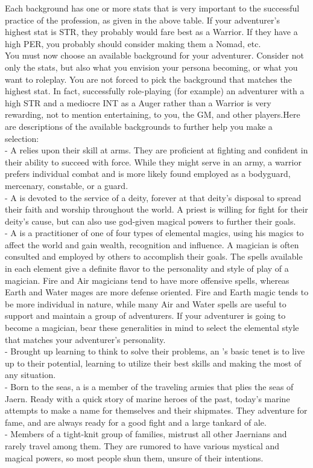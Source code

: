 \begin{multicols*}{2}
Each background has one or more stats that is very important to the successful practice of the profession, as given in the above table. If your adventurer's highest stat is
STR, they probably would fare best as a Warrior. If they have a high PER, you probably should consider making them a Nomad, etc.\\
You must now choose an available background for your adventurer. Consider not only the stats, but also what you envision your persona becoming, or what you want to roleplay. You are not forced to pick the background that matches the highest stat. In fact, successfully role-playing (for example) an adventurer with a high STR and a mediocre INT as a Auger rather than a Warrior is very rewarding, not to mention entertaining, to you, the GM, and other players.Here are descriptions of the available backgrounds to further help you make a selection:\\
- A  relies upon their skill at arms. They are proficient at fighting and confident in their ability to succeed with force. While they might serve in an army, a warrior prefers individual combat and is more likely found employed as a bodyguard, mercenary, constable, or a guard.\\
- A  is devoted to the service of a deity, forever at that deity's disposal to spread their faith and worship throughout the world. A priest is willing for fight for their deity's cause, but can also use god-given magical powers to further their goals.\\
- A  is a practitioner of one of four types of elemental magics, using his magics to affect the world and gain wealth, recognition and influence. A magician is often consulted and employed by others to accomplish their goals.
The spells available in each element give a definite flavor to the personality and style of play of a magician. Fire and Air magicians tend to have more offensive spells, whereas Earth and Water mages are more defense oriented. Fire and Earth magic tends to be more individual in nature, while many Air and Water spells are useful to support and maintain a group of adventurers. If your adventurer is going to become a magician, bear these generalities in mind to select the elemental style that matches your adventurer's personality.\\
- Brought up learning to think to solve their problems, an 's basic tenet is to live up to their potential, learning to utilize their best skills and making the most of any situation.\\
- Born to the seas, a  is a member of the traveling armies that plies the seas of Jaern. Ready with a quick story of marine heroes of the past, today's marine attempts to make a name for themselves and their shipmates. They adventure for fame, and are always ready for a good fight and a large tankard of ale.\\
- Members of a tight-knit group of families,  mistrust all other Jaernians and rarely travel among them. They are rumored to have various mystical and magical powers, so most people shun them, unsure of their intentions.


\end{multicols*}
